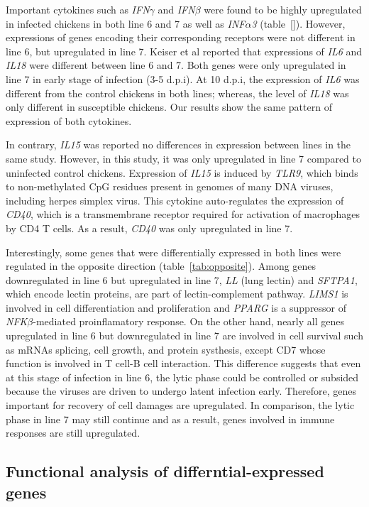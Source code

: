 \documentclass[10pt]{article}
\begin{document}
Important cytokines such as \textit{IFN$\gamma$} and \textit{IFN$\beta$} were found to be highly
upregulated in infected chickens in both line 6 and 7 as well as \textit{INF$\alpha$3} (table~\ref{}).
However, expressions of genes encoding their corresponding receptors
were not different in line 6, but upregulated in line 7.
Keiser et al reported that expressions of \textit{IL6} and \textit{IL18} were different between
line 6 and 7.
Both genes were only upregulated in line 7 in early stage of infection (3-5 d.p.i).
At 10 d.p.i, the expression of \textit{IL6} was different from the control chickens in both lines;
whereas, the level of \textit{IL18} was only different in susceptible chickens.
Our results show the same pattern of expression of both cytokines.

In contrary, \textit{IL15} was reported no differences in expression between lines in the same study.
However, in this study, it was only upregulated in line 7 compared to uninfected control chickens.
Expression of \textit{IL15} is induced by \textit{TLR9}, which binds to non-methylated CpG
residues present in genomes of many DNA viruses, including herpes simplex virus.
This cytokine auto-regulates the expression of \textit{CD40}, which is
a transmembrane receptor required for activation of macrophages by CD4 T cells.
As a result, \textit{CD40} was only upregulated in line 7.

Interestingly, some genes that were differentially expressed in both lines were
regulated in the opposite direction (table~\ref{tab:opposite}).
Among genes downregulated in line 6 but upregulated in line 7,
\textit{LL} (lung lectin) and \textit{SFTPA1}, which encode lectin proteins, are part of
lectin-complement pathway.
\textit{LIMS1} is involved in cell differentiation and proliferation and
\textit{PPARG} is a suppressor of \textit{NFK$\beta$}-mediated proinflamatory response.
On the other hand, nearly all genes upregulated in line 6 but downregulated in line 7
are involved in cell survival such as mRNAs splicing, cell growth, and protein systhesis,
except CD7 whose function is involved in T cell-B cell interaction.
This difference suggests that even at this stage of infection in line 6, the lytic phase 
could be controlled or subsided because the viruses are driven to undergo latent infection early.
Therefore, genes important for recovery of cell damages are upregulated.
In comparison, the lytic phase in line 7 may still continue and as a result, genes involved in
immune responses are still upregulated.

\subsection*{Functional analysis of differntial-expressed genes}
\end{document}
